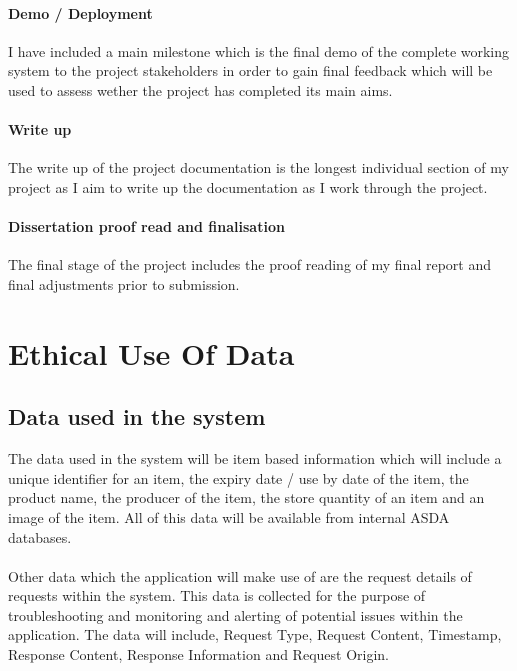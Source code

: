 \documentclass[a4paper,11pt]{report}
\begin{document}
\subsubsection{Demo / Deployment}
I have included a main milestone which is the final demo of the complete working system to the project stakeholders in order to gain final feedback which will be used to assess wether the project has completed its main aims. 
\subsubsection{Write up}
The write up of the project documentation is the longest individual section of my project as I aim to write up the documentation as I work through the project. 
\subsubsection{Dissertation proof read and finalisation}
The final stage of the project includes the proof reading of my final report and final adjustments prior to submission.
\chapter{Ethical Use Of Data}
\section{Data used in the system}
The data used in the system will be item based information which will include a unique identifier
for an item, the expiry date / use by date of the item, the product name, the producer of the item, 
the store quantity of an item and an image of the item. 
All of this data will be available from internal ASDA databases. 
\\
\\
Other data which the application will make use of are the request details of requests 
within the system. This data is collected for the purpose of troubleshooting and monitoring
and alerting of potential issues within the application. The data will include, Request Type,
Request Content, Timestamp, Response Content, Response Information and Request Origin.
   
   
\end{document}
